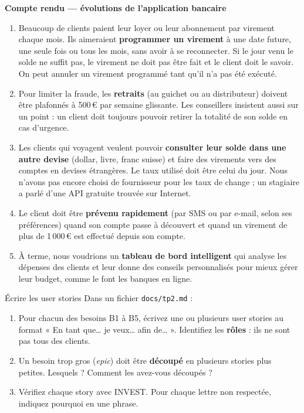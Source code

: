 \documentclass[11pt]{article}
\begin{document}
\begin{tcolorbox}[enhanced, breakable, colback=white, colframe=qalinelight, boxrule=0.6pt, arc=2pt,
  left=10pt, right=10pt, top=6pt, bottom=6pt, fontupper=\itshape\small]
\textbf{\upshape Compte rendu --- évolutions de l'application bancaire}

\begin{enumerate}[leftmargin=1.4em, label=\upshape B\arabic*.]
  \item Beaucoup de clients paient leur loyer ou leur abonnement par virement chaque mois. Ils aimeraient \textbf{programmer un virement} à une date future, une seule fois ou tous les mois, sans avoir à se reconnecter. Si le jour venu le solde ne suffit pas, le virement ne doit pas être fait et le client doit le savoir. On peut annuler un virement programmé tant qu'il n'a pas été exécuté.
  \item Pour limiter la fraude, les \textbf{retraits} (au guichet ou au distributeur) doivent être plafonnés à 500\,\euro{} par semaine glissante. Les conseillers insistent aussi sur un point : un client doit toujours pouvoir retirer la totalité de son solde en cas d'urgence.
  \item Les clients qui voyagent veulent pouvoir \textbf{consulter leur solde dans une autre devise} (dollar, livre, franc suisse) et faire des virements vers des comptes en devises étrangères. Le taux utilisé doit être celui du jour. Nous n'avons pas encore choisi de fournisseur pour les taux de change ; un stagiaire a parlé d'une API gratuite trouvée sur Internet.
  \item Le client doit être \textbf{prévenu rapidement} (par SMS ou par e-mail, selon ses préférences) quand son compte passe à découvert et quand un virement de plus de 1\,000\,\euro{} est effectué depuis son compte.
  \item À terme, nous voudrions un \textbf{tableau de bord intelligent} qui analyse les dépenses des clients et leur donne des conseils personnalisés pour mieux gérer leur budget, comme le font les banques en ligne.
\end{enumerate}
\end{tcolorbox}

\begin{exobox}{Écrire les user stories}
Dans un fichier \texttt{docs/tp2.md} :
\begin{enumerate}[leftmargin=1.4em]
  \item Pour chacun des besoins B1 à B5, écrivez une ou plusieurs user stories au format « En tant que\ldots{} je veux\ldots{} afin de\ldots{} ». Identifiez les \textbf{rôles} : ils ne sont pas tous des clients.
  \item Un besoin trop gros (\textit{epic}) doit être \textbf{découpé} en plusieurs stories plus petites. Lesquels ? Comment les avez-vous découpés ?
  \item Vérifiez chaque story avec INVEST. Pour chaque lettre non respectée, indiquez pourquoi en une phrase.
\end{enumerate}
\end{exobox}
\end{document}
